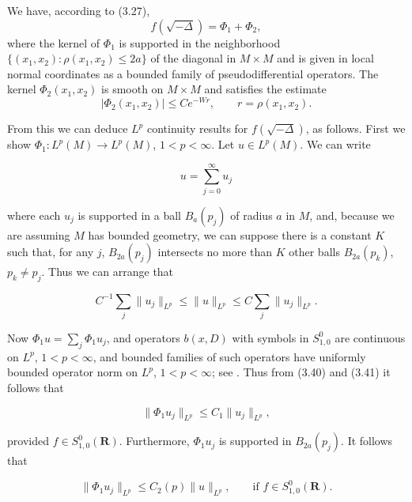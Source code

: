 We have, according to (3.27),
\begin{equation}\tag{3.44}
f(\sqrt{-\Delta})=\Phi_1+\Phi_2,
\end{equation}
where the kernel of $\Phi_1$ is supported in the neighborhood $\{(x_1,x_2): \rho(x_1,x_2)\le 2a\}$ of the diagonal in $M\times M$ and is given in local normal coordinates as a bounded family of pseudodifferential operators. The kernel $\Phi_2(x_1,x_2)$ is smooth on $M\times M$ and satisfies the estimate
\begin{equation}\tag{3.45}
|\Phi_2(x_1,x_2)|\le Ce^{-Wr},\qquad r=\rho(x_1,x_2).
\end{equation}

From this we can deduce $L^{p}$ continuity results for $f(\sqrt{-\Delta})$, as follows. First we show $\Phi_1: L^{p}(M)\to L^{p}(M)$, $1<p<\infty$. Let $u\in L^{p}(M)$. We can write

\begin{equation}\tag{3.46}
u=\sum_{j=0}^{\infty}u_{j}
\end{equation}

where each $u_{j}$ is supported in a ball $B_{a}(p_{j})$ of radius $a$ in $M$, and, because we are assuming $M$ has bounded geometry, we can suppose there is a constant $K$ such that, for any $j$, $B_{2a}(p_{j})$ intersects no more than $K$ other balls $B_{2a}(p_{k})$, $p_{k}\neq p_{j}$. Thus we can arrange that

\begin{equation}\tag{3.47}
C^{-1}\sum_{j}\|u_{j}\|_{L^{p}}\leq \|u\|_{L^{p}}\leq C\sum_{j}\|u_{j}\|_{L^{p}}.
\end{equation}

Now $\Phi_{1}u=\sum_{j}\Phi_{1}u_{j}$, and operators $b(x,D)$ with symbols in $S^{0}_{1,0}$ are continuous on $L^{p}$, $1<p<\infty$, and bounded families of such operators have uniformly bounded operator norm on $L^{p}$, $1<p<\infty$; see \cite[Chapter~XII]{cgt-taylor-pdo}. Thus from (3.40) and (3.41) it follows that

\begin{equation}\tag{3.48}
\|\Phi_{1}u_{j}\|_{L^{p}}\leq C_{1}\|u_{j}\|_{L^{p}},
\end{equation}

provided $f\in S^{0}_{1,0}(\mathbf{R})$. Furthermore, $\Phi_{1}u_{j}$ is supported in $B_{2a}(p_{j})$. It follows that

\begin{equation}\tag{3.49}
\|\Phi_{1}u_{j}\|_{L^{p}}\leq C_{2}(p)\|u\|_{L^{p}}, \qquad \text{if } f\in S^{0}_{1,0}(\mathbf{R}).
\end{equation}

